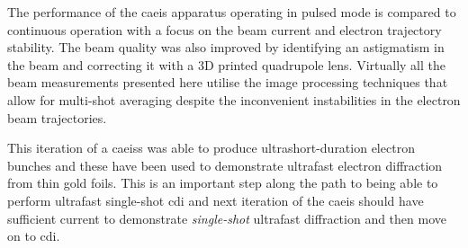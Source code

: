 The performance of the \gls{caeis} apparatus operating in pulsed mode is compared to continuous operation with a focus on the beam current and electron trajectory stability.
The beam quality was also improved by identifying an astigmatism in the beam and correcting it with a 3D printed quadrupole lens.
Virtually all the beam measurements presented here utilise the image processing techniques that allow for multi-shot averaging despite the inconvenient instabilities in the electron beam trajectories.

This iteration of a \glspl{caeis} was able to produce ultrashort-duration electron bunches and these have been used to demonstrate ultrafast electron diffraction from thin gold foils.
This is an important step along the path to being able to perform ultrafast single-shot \gls{cdi} and next iteration of the \gls{caeis} should have sufficient current to demonstrate \emph{single-shot} ultrafast diffraction and then move on to \gls{cdi}.